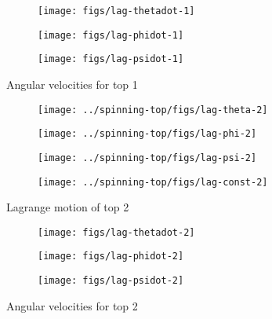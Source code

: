 \begin{figure}[H]
  \centering
  \begin{subfigure}{0.49\textwidth}
    \texttt{[image: figs/lag-thetadot-1]}
    \caption{}
  \end{subfigure}
  \begin{subfigure}{0.49\textwidth}
    \texttt{[image: figs/lag-phidot-1]}
    \caption{}
  \end{subfigure}
  \begin{subfigure}{0.49\textwidth}
    \texttt{[image: figs/lag-psidot-1]}
    \caption{}
  \end{subfigure}
  \caption{Angular velocities for top 1}
\end{figure}

\begin{figure}[H]
  \centering
  \begin{subfigure}{0.49\textwidth}
    \texttt{[image: ../spinning-top/figs/lag-theta-2]}
    \caption{}
  \end{subfigure}
  \begin{subfigure}{0.49\textwidth}
    \texttt{[image: ../spinning-top/figs/lag-phi-2]}
    \caption{}
  \end{subfigure}
  \begin{subfigure}{0.49\textwidth}
    \texttt{[image: ../spinning-top/figs/lag-psi-2]}
    \caption{}
    \end{subfigure}
  \begin{subfigure}{0.49\textwidth}
    \texttt{[image: ../spinning-top/figs/lag-const-2]}
    \caption{}
    \label{fig:lagE2}
  \end{subfigure}
  \caption{Lagrange motion of top 2}
  \label{fig:motion-Top2}
\end{figure}

\begin{figure}[H]
  \centering
  \begin{subfigure}{0.49\textwidth}
    \texttt{[image: figs/lag-thetadot-2]}
    \caption{}
  \end{subfigure}
  \begin{subfigure}{0.49\textwidth}
    \texttt{[image: figs/lag-phidot-2]}
    \caption{}
  \end{subfigure}
  \begin{subfigure}{0.49\textwidth}
    \texttt{[image: figs/lag-psidot-2]}
    \caption{}
  \end{subfigure}
  \caption{Angular velocities for top 2}
\end{figure}


